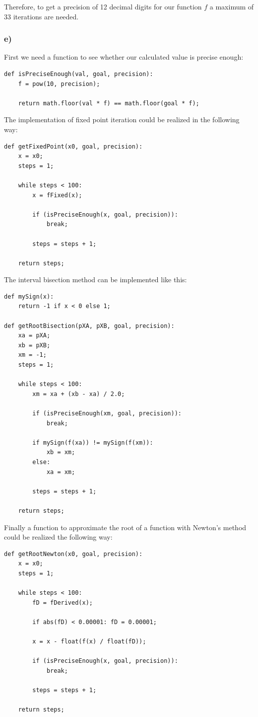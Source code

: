 Therefore, to get a precision of 12 decimal digits for our function $f$ a maximum of 33 iterations are needed.

\subsubsection{e)}

First we need a function to see whether our calculated value is precise enough:

\begin{lstlisting}[caption=Determine if an approximation is precise enough]
def isPreciseEnough(val, goal, precision):
	f = pow(10, precision);

	return math.floor(val * f) == math.floor(goal * f);
\end{lstlisting}

The implementation of fixed point iteration could be realized in the following way:

\begin{lstlisting}[caption=Fixed point iteration method]
def getFixedPoint(x0, goal, precision):
	x = x0;
	steps = 1;
	
	while steps < 100:
		x = fFixed(x);
		
		if (isPreciseEnough(x, goal, precision)):
			break;
		
		steps = steps + 1;
	
	return steps;
\end{lstlisting}

The interval bisection method can be implemented like this:

\begin{lstlisting}[caption=Interval Bisection method]
def mySign(x):
	return -1 if x < 0 else 1;

def getRootBisection(pXA, pXB, goal, precision):
	xa = pXA;
	xb = pXB;
	xm = -1;
	steps = 1;
	
	while steps < 100:
		xm = xa + (xb - xa) / 2.0;
		
		if (isPreciseEnough(xm, goal, precision)):
			break;
		
		if mySign(f(xa)) != mySign(f(xm)):
			xb = xm;
		else:
			xa = xm;
		
		steps = steps + 1;
	
	return steps;
\end{lstlisting}

Finally a function to approximate the root of a function with Newton's method could be realized the following way:

\begin{lstlisting}[caption=Newton's method]
def getRootNewton(x0, goal, precision):
	x = x0;
	steps = 1;
	
	while steps < 100:
		fD = fDerived(x);
		
		if abs(fD) < 0.00001: fD = 0.00001;
		
		x = x - float(f(x) / float(fD));
		
		if (isPreciseEnough(x, goal, precision)):
			break;
		
		steps = steps + 1;
	
	return steps;
\end{lstlisting}

